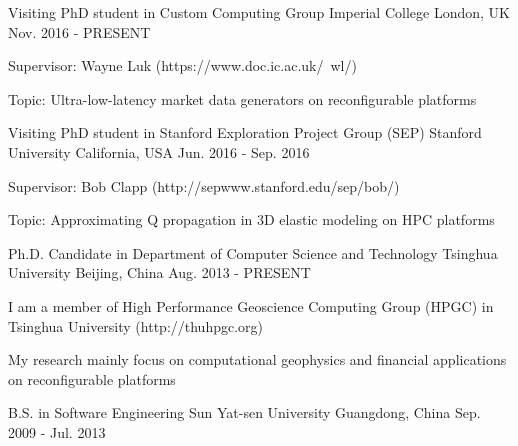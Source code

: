 \documentclass[11pt, a4paper]{awesome-cv}
\begin{document}
\begin{cventries}

  \cventry
    {Visiting PhD student in Custom Computing Group} %
    {Imperial College} %
    {London, UK} %
    {Nov. 2016 - PRESENT} %
    {
      \begin{cvitems} %
        \item {Supervisor: Wayne Luk (https://www.doc.ic.ac.uk/~wl/)}      
        \item {Topic: Ultra-low-latency market data generators on reconfigurable platforms}
      \end{cvitems}
    }
    
  \cventry
    {Visiting PhD student in Stanford Exploration Project Group (SEP)} %
    {Stanford University} %
    {California, USA} %
    {Jun. 2016 - Sep. 2016} %
    {
      \begin{cvitems} %
        \item {Supervisor: Bob Clapp (http://sepwww.stanford.edu/sep/bob/)}		
        \item {Topic: Approximating Q propagation in 3D elastic modeling on HPC platforms}
      \end{cvitems}
    }

  \cventry
    {Ph.D. Candidate in Department of Computer Science and Technology} %
    {Tsinghua University} %
    {Beijing, China} %
    {Aug. 2013 - PRESENT} %
    {
      \begin{cvitems} %
        \item {I am a member of High Performance Geoscience Computing Group (HPGC) in Tsinghua University (http://thuhpgc.org)}
        \item {My research mainly focus on computational geophysics and financial applications on reconfigurable platforms}
      \end{cvitems}
    }

  \cventry
    {B.S. in Software Engineering} %
    {Sun Yat-sen University} %
    {Guangdong, China} %
    {Sep. 2009 - Jul. 2013} %
    {}
\end{cventries}

\end{document}
